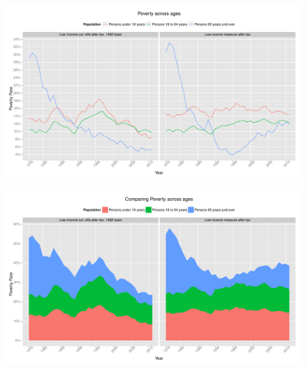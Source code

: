 \documentclass{article}\usepackage[]{graphicx}\usepackage[]{color}
\makeatletter
\def\maxwidth{ %
  \ifdim\Gin@nat@width>\linewidth
    \linewidth
  \else
    \Gin@nat@width
  \fi
}
\newenvironment{knitrout}{}{} %
\makeatother
\begin{document}
\begin{figure}[ht]
\begin{center}
\begin{knitrout}
\color{fgcolor}
\includegraphics[width=\maxwidth]{figure/unnamed-chunk-4} 

\end{knitrout}

\end{center}
\end{figure}
\begin{figure}[ht]
\begin{center}
\begin{knitrout}
\color{fgcolor}
\includegraphics[width=\maxwidth]{figure/unnamed-chunk-5} 

\end{knitrout}

\end{center}
\end{figure}
\end{document}
